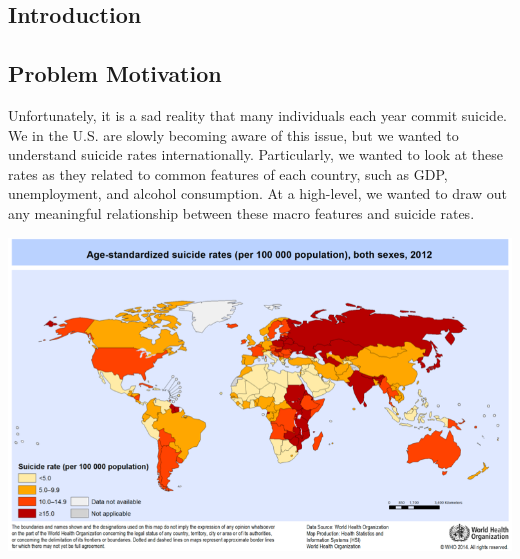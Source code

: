 \documentclass{article}
\begin{document}
\begin{multicols}{2}
\section{Introduction}
\subsection{Problem Motivation} Unfortunately, it is a sad reality that many individuals each year commit suicide. We in the U.S. are slowly becoming aware of this issue, but we wanted to understand suicide rates internationally. Particularly, we wanted to look at these rates as they related to common features of each country, such as GDP, unemployment, and alcohol consumption. At a high-level, we wanted to draw out any meaningful relationship between these macro features and suicide rates.

\begingroup
    \includegraphics[width=\columnwidth]{2012-data-vis-map.png}
    \begin{spacing}{1.2}
    \label{fig:map} 
	\end{spacing}
\endgroup



\end{multicols}
\end{document}
